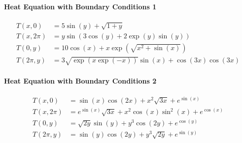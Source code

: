  \paragraph{Heat Equation with Boundary Conditions 1}
 \label{para:heat1}
 \begin{align*}
     T(x, 0) &= 5\sin(y) + \sqrt{1+y} \\
    T(x, 2\pi) &= y\sin\left(3\cos(y) + 2\exp(y)\sin(y)\right) \\
   T(0, y) &= 10\cos(x) + x\exp(\sqrt{x^2 + \sin(x)}) \\
   T(2\pi, y) &= 3\sqrt{\exp(x\exp(-x))}\sin(x) + \cos(3x)\cos(3x)
 \end{align*}
 \paragraph{Heat Equation with Boundary Conditions 2}
 \label{para:heat2}
\begin{align*}
    T(x, 0) &= \sin(x) \cos(2x) + x^2\sqrt{3x}  + e^{\sin(x)} \\
    T(x, 2\pi) &= e^{\sin(x)} \sqrt{3x} + x^2 \cos(x)  \sin^2(x)   + e^{\cos(x)} \\
    T(0, y) &= \sqrt{2y}  \sin(y) + y^3\cos(2y)   + e^{\cos(y)} \\
    T(2\pi, y) &= \sin(y) \cos(2y) + y^3\sqrt{2y}   + e^{\sin(y)}
\end{align*}
